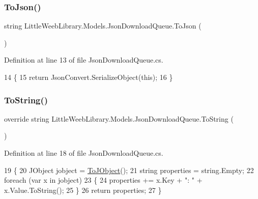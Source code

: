 \subsubsection{\texorpdfstring{To\+Json()}{ToJson()}}
{\footnotesize\ttfamily string Little\+Weeb\+Library.\+Models.\+Json\+Download\+Queue.\+To\+Json (\begin{DoxyParamCaption}{ }\end{DoxyParamCaption})}



Definition at line 13 of file Json\+Download\+Queue.\+cs.


\begin{DoxyCode}
14         \{
15             \textcolor{keywordflow}{return} JsonConvert.SerializeObject(\textcolor{keyword}{this});
16         \}
\end{DoxyCode}
\mbox{\label{class_little_weeb_library_1_1_models_1_1_json_download_queue_a0613fd2171f103708bdc981048f3b80c}} 
\subsubsection{\texorpdfstring{To\+String()}{ToString()}}
{\footnotesize\ttfamily override string Little\+Weeb\+Library.\+Models.\+Json\+Download\+Queue.\+To\+String (\begin{DoxyParamCaption}{ }\end{DoxyParamCaption})}



Definition at line 18 of file Json\+Download\+Queue.\+cs.


\begin{DoxyCode}
19         \{
20             JObject jobject = \mbox{\hyperlink{class_little_weeb_library_1_1_models_1_1_json_download_queue_a1d77053fc493aa88857bcafd6fea4bf7}{ToJObject}}();
21             \textcolor{keywordtype}{string} properties = \textcolor{keywordtype}{string}.Empty;
22             \textcolor{keywordflow}{foreach} (var x \textcolor{keywordflow}{in} jobject)
23             \{
24                 properties += x.Key + \textcolor{stringliteral}{": "} + x.Value.ToString();
25             \}
26             \textcolor{keywordflow}{return} properties;
27         \}
\end{DoxyCode}
\mbox{\label{class_little_weeb_library_1_1_models_1_1_json_download_queue_a1d77053fc493aa88857bcafd6fea4bf7}} 
